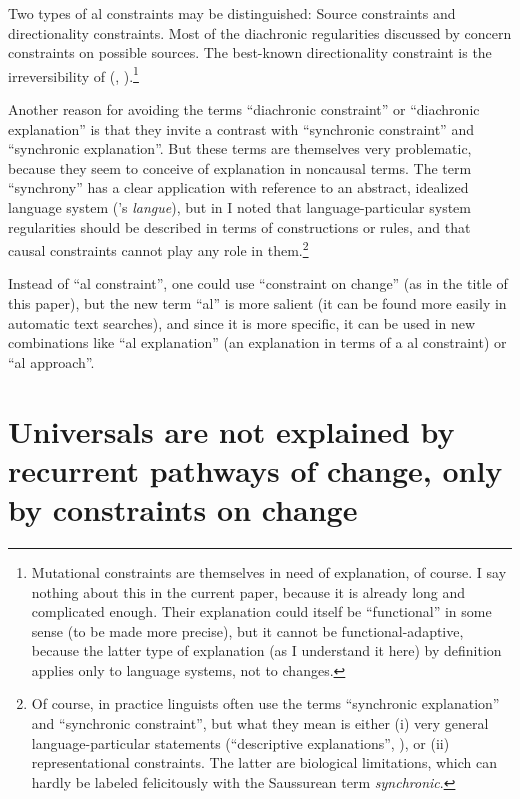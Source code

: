 \documentclass[output=paper]{langsci/langscibook}
\begin{document}
Two types of al constraints may be distinguished: Source constraints and directionality constraints. Most of the diachronic regularities discussed by \citet{Cristofaro2017} concern constraints on possible sources. The best-known directionality constraint is the irreversibility of  (\citealt{Haspelmath1999_Irrev}, \citeyear*{ Haspelmath2004_Direction}).\footnote{Mutational constraints 
\label{fn:haspelmath:mutationalconstraints}
are themselves in need of explanation, of course. I say nothing about this in the current paper, because it is already long and complicated enough. Their explanation could itself be “functional” in some sense (to be made more precise), but it cannot be functional-adaptive, because the latter type of explanation (as I understand it here) by definition applies only to language systems, not to changes.} 

Another reason for avoiding the terms “diachronic constraint” or “diachronic explanation” is that they invite a contrast with “synchronic constraint” and “synchronic explanation”. But these terms are themselves very problematic, because they seem to conceive of explanation in noncausal terms. The term “synchrony” has a clear application with reference to an abstract, idealized language system (’s \textit{langue}), but in  I noted that language-particular system regularities should be described in terms of constructions or rules, and that causal constraints cannot play any role in them.\footnote{Of course, in practice linguists often use the terms “synchronic explanation” and “synchronic constraint”, but what they mean is either (i) very general language-particular statements (“descriptive explanations”, ), or (ii) representational constraints. The latter are biological limitations, which can hardly be labeled felicitously with the Saussurean  term \textit{synchronic}.} 

Instead of “al constraint”, one could use “constraint on change” (as in the title of this paper), but the new term “al” is more salient (it can be found more easily in automatic text searches), and since it is more specific, it can be used in new combinations like “al explanation” (an explanation in terms of a al constraint) or “al approach”.

\section{Universals are not explained by recurrent pathways of change, only by constraints on change}\label{sec:haspelmath:4}
\end{document}
